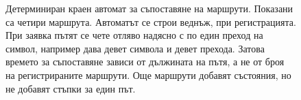 \begin{figure}[htbp]
\caption{Детерминиран краен автомат за съпоставяне на маршрути. Показани са
четири маршрута. Автоматът се строи веднъж, при регистрацията. При заявка
пътят се чете отляво надясно с по един преход на символ, например
 дава девет символа и девет прехода. Затова времето за
съпоставяне зависи от дължината на пътя, а не от броя на регистрираните
маршрути. Още маршрути добавят състояния, но не добавят стъпки за един път.}
\label{fig:dfa_matching}
\end{figure}
